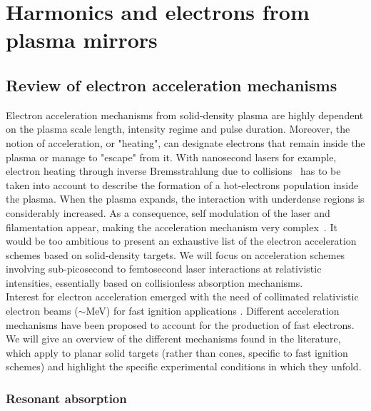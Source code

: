 \chapter{Harmonics and electrons from plasma mirrors}
\label{Anticorrelated harmonic and electron emission from plasma mirrors}
\minitoc
\thispagestyle{empty}

\section{Review of electron acceleration mechanisms}\label{section:Review of electron acceleration mechanisms}

Electron acceleration mechanisms from solid-density plasma are highly dependent on the plasma scale length, intensity regime and pulse duration. Moreover, the notion of acceleration, or "heating", can designate electrons that remain inside the plasma or manage to "escape" from it. With nanosecond lasers for example, electron heating through inverse Bremsstrahlung due to collisions~\cite{schlessinger1979inverse,johnston1973correct} has to be taken into account to describe the formation of a hot-electrons population inside the plasma. When the plasma expands, the interaction with underdense regions is considerably increased. As a consequence, self modulation of the laser and filamentation appear, making the acceleration mechanism very complex~\cite{bach1983intensity}. It would be too ambitious to present an exhaustive list of the electron acceleration schemes based on solid-density targets. We will focus on acceleration schemes involving sub-picosecond to femtosecond laser interactions at relativistic intensities, essentially based on collisionless absorption mechanisms.\\


\noindent Interest for electron acceleration emerged with the need of collimated relativistic electron beams ($\sim$MeV) for fast ignition applications \cite{honrubia2006three}. Different acceleration mechanisms have been proposed to account for the production of fast electrons. We will give an overview of the different mechanisms found in the literature, which apply to planar solid targets (rather than cones, specific to fast ignition schemes) and highlight the specific experimental conditions in which they unfold.

\subsection{Resonant absorption}

